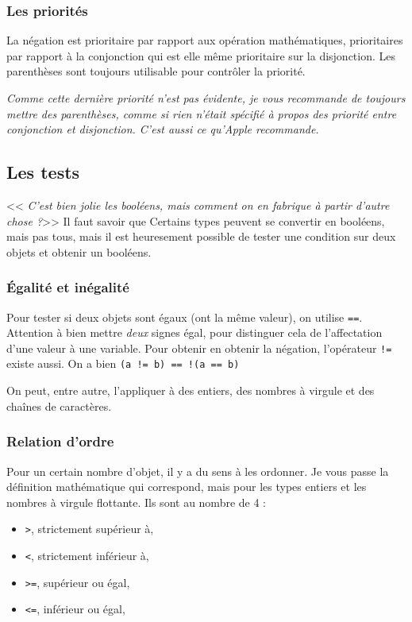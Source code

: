 \subsubsection{Les priorités}
La négation est prioritaire par rapport aux opération mathématiques, prioritaires par rapport à la conjonction qui est elle même prioritaire sur la disjonction. Les parenthèses sont toujours utilisable pour contrôler la priorité.

\emph{Comme cette dernière priorité n'est pas évidente, je vous recommande de toujours mettre des parenthèses, comme si rien n'était spécifié à propos des priorité entre conjonction et disjonction. C'est aussi ce qu'\emph{Apple} recommande.}
\subsection{Les tests}
<< \emph{C'est bien jolie les booléens, mais comment on en fabrique à partir d'autre chose ?}>>
Il faut savoir que Certains types peuvent se convertir en booléens, mais pas tous, mais il est heuresement possible de tester une condition sur deux objets et obtenir un booléens.
\subsubsection{Égalité et inégalité}
Pour tester si deux objets sont égaux (ont la même valeur),
on utilise \verb"==". Attention à bien mettre \emph{deux} signes égal, pour distinguer cela de l'affectation d'une valeur à une variable. Pour obtenir en obtenir la négation, l'opérateur \verb"!=" existe aussi. On a bien \texttt{(a != b) == !(a == b)}

On peut, entre autre, l'appliquer à des entiers, des nombres à virgule et des chaînes de caractères.
\subsubsection{Relation d'ordre}
Pour un certain nombre d'objet, il y a du sens à les ordonner.
Je vous passe la définition mathématique qui correspond, mais pour les types entiers et les nombres à virgule flottante.
Ils sont au nombre de 4 :
\begin{itemize}
\item \verb">", strictement supérieur à,
\item \verb"<", strictement inférieur à,
\item \verb">=", supérieur ou égal,
\item \verb"<=", inférieur ou égal,
\end{itemize}

